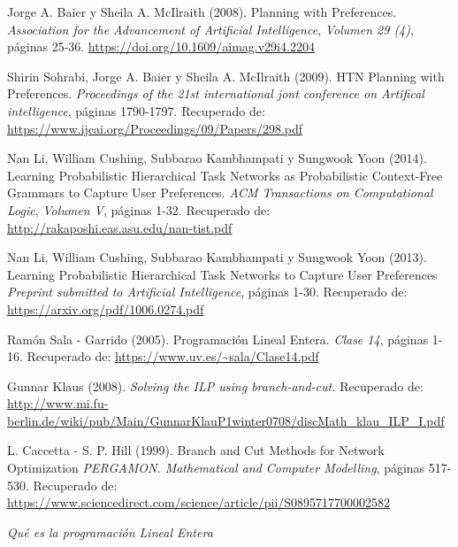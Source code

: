 \documentclass[a4paper]{article}
\begin{document}
\begin{thebibliography}{X}
Jorge A. Baier y Sheila A. McIlraith (2008). Planning with Preferences. \textit{Association for the Advancement of Artificial Intelligence}, \textit{Volumen 29 (4)}, páginas 25-36.
\url{https://doi.org/10.1609/aimag.v29i4.2204}


Shirin Sohrabi, Jorge A. Baier y Sheila A. McIlraith (2009). HTN Planning with Preferences. \textit{Proceedings of the 21st international jont conference on Artifical intelligence},  páginas 1790-1797.
Recuperado de: \url{https://www.ijcai.org/Proceedings/09/Papers/298.pdf}


 Nan Li, William Cushing, Subbarao Kambhampati y Sungwook Yoon (2014). Learning Probabilistic Hierarchical Task Networks as Probabilistic Context-Free Grammars to Capture User Preferences. \textit{ACM Transactions on Computational Logic}, \textit{Volumen V}, páginas 1-32.
Recuperado de: \url{http://rakaposhi.eas.asu.edu/nan-tist.pdf}


 Nan Li, William Cushing, Subbarao Kambhampati y Sungwook Yoon (2013). Learning Probabilistic Hierarchical Task Networks to Capture User Preferences \textit{Preprint submitted to Artificial Intelligence}, páginas 1-30.
Recuperado de: \url{https://arxiv.org/pdf/1006.0274.pdf}


 Ramón Sala - Garrido (2005). Programación Lineal Entera. \textit{Clase 14}, páginas 1-16.
Recuperado de: \url{https://www.uv.es/~sala/Clase14.pdf}


 Gunnar Klaus (2008).  \textit{Solving the ILP using branch-and-cut.}
Recuperado de: \url{http://www.mi.fu-berlin.de/wiki/pub/Main/GunnarKlauP1winter0708/discMath_klau_ILP_I.pdf}


 L. Caccetta - S. P. Hill (1999). Branch and Cut Methods for Network Optimization  \textit{PERGAMON. Mathematical and Computer Modelling}, páginas 517-530.
Recuperado de: \url{https://www.sciencedirect.com/science/article/pii/S0895717700002582}
 

 \textit{Qué es la programación Lineal Entera}


\end{thebibliography}
\end{document}
